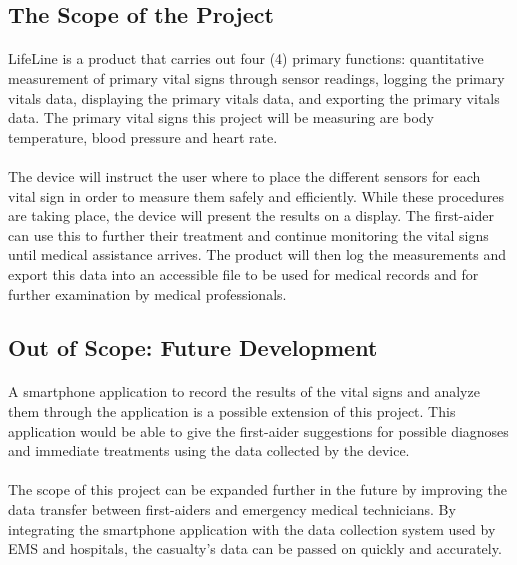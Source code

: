 \documentclass{article}
\begin{document}
	\subsection{The Scope of the Project}
	\paragraph{}
	LifeLine is a product that carries out four (4) primary functions: quantitative measurement of primary vital signs through sensor readings, logging the primary vitals data, displaying the primary vitals data, and exporting the primary vitals data. The primary vital signs this project will be measuring are body temperature, blood pressure and heart rate. 
	\paragraph{}
	The device will instruct the user where to place the different sensors for each vital sign in order to measure them safely and efficiently. While these procedures are taking place, the device will present the results on a display. The first-aider can use this to further their treatment and continue monitoring the vital signs until medical assistance arrives. The product will then log the measurements and export this data into an accessible file to be used for medical records and for further examination by medical professionals. 
	
	\subsection{Out of Scope: Future Development}
    \paragraph{}
    A smartphone application to record the results of the vital signs and analyze them through the application is a possible extension of this project. This application would be able to give the first-aider suggestions for possible diagnoses and immediate treatments using the data collected by the device.
    \paragraph{}
    The scope of this project can be expanded further in the future by improving the data transfer between first-aiders and emergency medical technicians. By integrating the smartphone application with the data collection system used by EMS and hospitals, the casualty's data can be passed on quickly and accurately.
\end{document}
